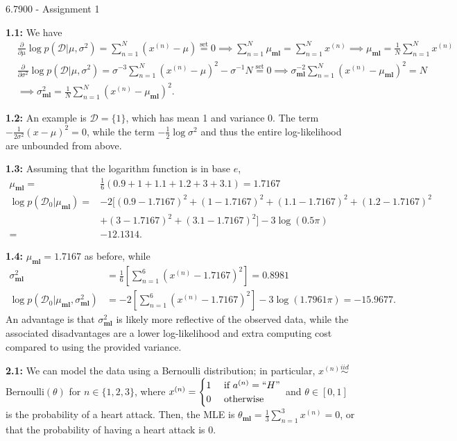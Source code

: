 \documentclass[12pt]{article}
\newcommand{\m}{\mathbf{ml}}
\begin{document}
\begin{center}
{\Large 6.7900 - Assignment 1}
\end{center}

\textbf{1.1:} We have\begin{align*}
    &\frac{\partial}{\partial\mu}\log p(\mathcal{D}|\mu,\sigma^2)=\sum_{n=1}^N (x^{(n)}-\mu)\overset{\text{set}}{=}0\implies\sum_{n=1}^N\mu_{\m}=\sum_{n=1}^N x^{(n)}\implies\mu_{\m}=\frac{1}{N}\sum_{n=1}^N x^{(n)}\\
    &\frac{\partial}{\partial\sigma^2}\log p(\mathcal{D}|\mu,\sigma^2)=\sigma^{-3}\sum_{n=1}^N (x^{(n)}-\mu)^2-\sigma^{-1}N\overset{\text{set}}{=}0\implies\sigma_{\m}^{-2}\sum_{n=1}^N (x^{(n)}-\mu_{\m})^2=N\\
    &\implies\sigma_{\m}^2=\frac{1}{N}\sum_{n=1}^N (x^{(n)}-\mu_{\m})^2.
\end{align*}

\textbf{1.2:} An example is $\mathcal{D}=\{1\}$, which has mean 1 and variance 0. The term $-\frac{1}{2\sigma^2}(x-\mu)^2=0$, while the term $-\frac{1}{2}\log\sigma^2$ and thus the entire log-likelihood are unbounded from above.

\textbf{1.3:} Assuming that the logarithm function is in base $e$,\begin{align*}
    \mu_{\m}=&\frac{1}{6}(0.9+1+1.1+1.2+3+3.1)=1.7167\\
    \log p(\mathcal{D}_0|\mu_{\m})=&-2[(0.9-1.7167)^2+(1-1.7167)^2+(1.1-1.7167)^2+(1.2-1.7167)^2\\
    &+(3-1.7167)^2+(3.1-1.7167)^2]-3\log(0.5\pi)\\
    =&-12.1314.
\end{align*}

\textbf{1.4:} $\mu_{\m}=1.7167$ as before, while\begin{align*}
    \sigma_{\m}^2&=\frac{1}{6}[\sum_{n=1}^6 (x^{(n)}-1.7167)^2]=0.8981\\
    \log p(\mathcal{D_0}|\mu_{\m},\sigma_{\m}^2)&=-2[\sum_{n=1}^6 (x^{(n)}-1.7167)^2]-3\log(1.7961\pi)=-15.9677.
\end{align*}An advantage is that $\sigma_{\m}^2$ is likely more reflective of the observed data, while the associated disadvantages are a lower log-likelihood and extra computing cost compared to using the provided variance.

\textbf{2.1:} We can model the data using a Bernoulli distribution; in particular, $x^{(n)}\overset{iid}{\sim}$ Bernoulli$(\theta)$ for $n\in\{1,2,3\}$, where $x^{(n)}=\begin{cases} 1&\text{ if }a^{(n)}=``H" \\ 0&\text{ otherwise} \end{cases}$ and $\theta\in[0,1]$ is the probability of a heart attack. Then, the MLE is $\theta_{\m}=\frac{1}{3}\sum_{n=1}^3 x^{(n)}=0$, or that the probability of having a heart attack is 0.
\end{document}
